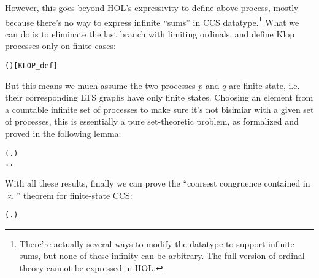 \documentclass{eptcs} %
\begin{document}
However, this goes beyond HOL's expressivity to define above process, mostly
because there's no way to express infinite ``sums'' in CCS
datatype.\footnote{There're actually several ways to modify the
  datatype to support infinite sums, but none of these infinity can be
arbitrary. The full version of ordinal theory cannot be expressed in HOL.}
What we can do is to eliminate the last branch with limiting
ordinals, and define Klop processes only on finite cases:
\begin{alltt}
   \HOLSymConst{=} 
  ( ) \HOLSymConst{=}    \HOLSymConst{+}    \hfill[KLOP_def]
\end{alltt}
But this means we much assume the two processes $p$ and $q$ are
finite-state, i.e. their corresponding LTS graphs have only finite
states. Choosing an element from a countable infinite set of processes
to make sure it's not bisimiar with a given set of processes, this is
essentially a pure set-theoretic problem, as formalized and proved in
the following lemma:
\begin{alltt}
\HOLTokenTurnstile{}   \HOLSymConst{\HOLTokenImp{}}
     \HOLSymConst{\HOLTokenConj{}}   \HOLSymConst{\HOLTokenConj{}}
   (\HOLSymConst{\HOLTokenForall{}} .  \HOLSymConst{\HOLTokenIn{}}  \HOLSymConst{\HOLTokenConj{}}  \HOLSymConst{\HOLTokenIn{}}  \HOLSymConst{\HOLTokenConj{}}  \HOLSymConst{\HOLTokenNotEqual{}}  \HOLSymConst{\HOLTokenImp{}} \HOLSymConst{\HOLTokenNeg{}}  ) \HOLSymConst{\HOLTokenImp{}}
   \HOLSymConst{\HOLTokenExists{}}.  \HOLSymConst{\HOLTokenIn{}}  \HOLSymConst{\HOLTokenConj{}} \HOLSymConst{\HOLTokenForall{}}.  \HOLSymConst{\HOLTokenIn{}}  \HOLSymConst{\HOLTokenImp{}} \HOLSymConst{\HOLTokenNeg{}}  
\end{alltt}

With all these results, finally we can prove the ``coarsest congruence
contained in $\approx$'' theorem for finite-state CCS:
\begin{alltt}
\HOLTokenTurnstile{}   \HOLSymConst{\HOLTokenConj{}}   \HOLSymConst{\HOLTokenImp{}}
   ( \HOLSymConst{\HOLTokenObsCongr}  \HOLSymConst{\HOLTokenEquiv{}} \HOLSymConst{\HOLTokenForall{}}.  \HOLSymConst{+}  \HOLSymConst{\HOLTokenWeakEQ}  \HOLSymConst{+} )
\end{alltt}
\end{document}
